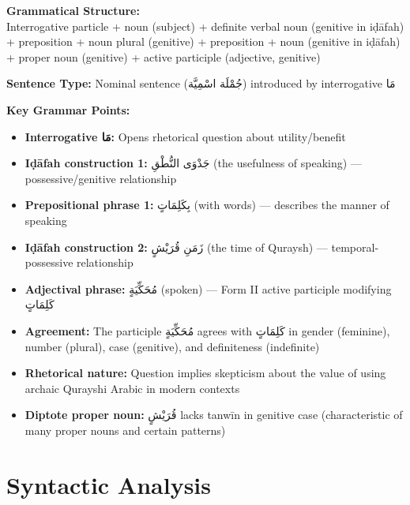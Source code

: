 \documentclass[letterpaper,12pt]{article}
\begin{document}
\begin{tcolorbox}[colback=boxcolor,colframe=headercolor,breakable]
\textbf{Grammatical Structure:}\\
Interrogative particle + noun (subject) + definite verbal noun (genitive in iḍāfah) + preposition + noun plural (genitive) + preposition + noun (genitive in iḍāfah) + proper noun (genitive) + active participle (adjective, genitive)

\vspace{0.5em}
\textbf{Sentence Type:} Nominal sentence (\textarabic{جُمْلَة اسْمِيَّة}) introduced by interrogative \textarabic{مَا}

\vspace{0.5em}
\textbf{Key Grammar Points:}
\begin{itemize}
\item \textbf{Interrogative \textarabic{مَا}:} Opens rhetorical question about utility/benefit
\item \textbf{Iḍāfah construction 1:} \textarabic{جَدْوَى النُّطْقِ} (the usefulness of speaking) — possessive/genitive relationship
\item \textbf{Prepositional phrase 1:} \textarabic{بِكَلِمَاتٍ} (with words) — describes the manner of speaking
\item \textbf{Iḍāfah construction 2:} \textarabic{زَمَنِ قُرَيْشٍ} (the time of Quraysh) — temporal-possessive relationship
\item \textbf{Adjectival phrase:} \textarabic{مُحَكِّيَةٍ} (spoken) — Form II active participle modifying \textarabic{كَلِمَاتٍ}
\item \textbf{Agreement:} The participle \textarabic{مُحَكِّيَةٍ} agrees with \textarabic{كَلِمَاتٍ} in gender (feminine), number (plural), case (genitive), and definiteness (indefinite)
\item \textbf{Rhetorical nature:} Question implies skepticism about the value of using archaic Qurayshi Arabic in modern contexts
\item \textbf{Diptote proper noun:} \textarabic{قُرَيْشٍ} lacks tanwīn in genitive case (characteristic of many proper nouns and certain patterns)
\end{itemize}
\end{tcolorbox}

\section{Syntactic Analysis
}
\end{document}
